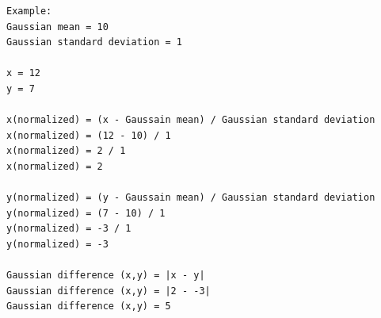 \begin{lstlisting}[label=proof:gaussian_difference_different]
Example:
Gaussian mean = 10
Gaussian standard deviation = 1

x = 12
y = 7

x(normalized) = (x - Gaussain mean) / Gaussian standard deviation
x(normalized) = (12 - 10) / 1
x(normalized) = 2 / 1
x(normalized) = 2

y(normalized) = (y - Gaussain mean) / Gaussian standard deviation
y(normalized) = (7 - 10) / 1
y(normalized) = -3 / 1
y(normalized) = -3

Gaussian difference (x,y) = |x - y|
Gaussian difference (x,y) = |2 - -3|
Gaussian difference (x,y) = 5
\end{lstlisting}






